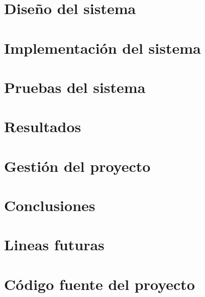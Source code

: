 \documentclass[a4paper,oneside,12pt,titlepage]{report}
\begin{document}
    \chapter{Diseño del sistema}
    
    \newpage

    \chapter{Implementación del sistema}
    
    \newpage

    \chapter{Pruebas del sistema}
    
    \newpage

    \chapter{Resultados}
    
    \newpage

    \chapter{Gestión del proyecto}
    
    \newpage

    \chapter{Conclusiones}
    
    \newpage

    \chapter{Lineas futuras}
    
    \newpage

    \printbibliography[heading=bibintoc]

    \appendix
    \clearpage

    \chapter{Código fuente del proyecto} 
    
    \newpage
\end{document}
